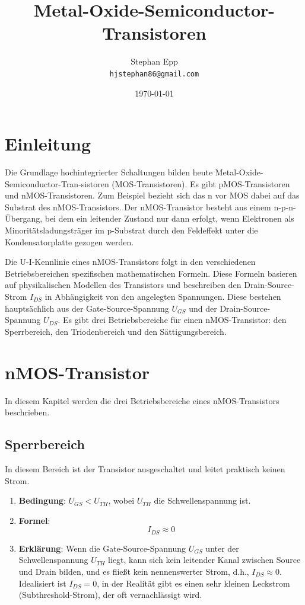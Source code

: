 \documentclass{scrarticle}
\title{Metal-Oxide-Semiconductor-Transistoren}
\author{Stephan Epp\\\texttt{hjstephan86@gmail.com}}
\date{\today}
\numberwithin{equation}{section}
\begin{document}
	\maketitle
	\vspace{5em}
	\tableofcontents
	\newpage

\section{Einleitung}
Die Grundlage hochintegrierter Schaltungen bilden heute Metal-Oxide-Semiconductor-Tran-sistoren (MOS-Transistoren). Es gibt pMOS-Transistoren und nMOS-Transistoren. Zum Beispiel bezieht sich das n vor MOS dabei auf das Substrat des nMOS-Transistors. Der nMOS-Transistor besteht aus einem n-p-n-Übergang, bei dem ein leitender Zustand nur dann erfolgt, wenn Elektronen als Minoritätsladungsträger im p-Substrat durch den Feldeffekt unter die Kondensatorplatte gezogen werden.

Die U-I-Kennlinie eines nMOS-Transistors folgt in den verschiedenen Betriebsbereichen spezifischen mathematischen Formeln. Diese Formeln basieren auf physikalischen Modellen des Transistors und beschreiben den Drain-Source-Strom $I_{DS}$ in Abhängigkeit von den angelegten Spannungen. Diese bestehen hauptsächlich aus der Gate-Source-Spannung $U_{GS}$ und der Drain-Source-Spannung $U_{DS}$. Es gibt drei Betriebsbereiche für einen nMOS-Transistor: den Sperrbereich, den Triodenbereich und den Sättigungsbereich.

\section{nMOS-Transistor}
In diesem Kapitel werden die drei Betriebsbereiche eines nMOS-Transistors beschrieben.
\subsection{Sperrbereich}
In diesem Bereich ist der Transistor ausgeschaltet und leitet praktisch keinen Strom.

\begin{enumerate}
	\renewcommand{\labelenumi}{} %
	\item \textbf{Bedingung}: $U_{GS} < U_{TH}$, wobei $U_{TH}$ die Schwellenspannung ist.
	\item \textbf{Formel}:
	\begin{equation*}
		I_{DS} \approx 0
	\end{equation*}
	\item \textbf{Erklärung}: Wenn die Gate-Source-Spannung $U_{GS}$ unter der Schwellenspannung $U_{TH}$ liegt, kann sich kein leitender Kanal zwischen Source und Drain bilden, und es fließt kein nennenswerter Strom, d.h., $I_{DS} \approx 0$. Idealisiert ist $I_{DS} = 0$, in der Realität gibt es einen sehr kleinen Leckstrom (Subthreshold-Strom), der oft vernachlässigt wird.
\end{enumerate}
\end{document}
